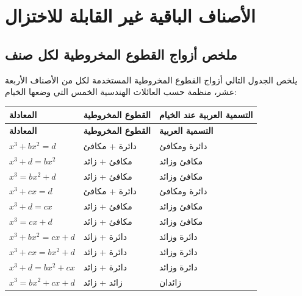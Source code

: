 \documentclass[11pt,a4paper]{book}
\newcommand{\ar}[1]{\leavevmode\arabicfont\beginR #1\endR}
\begin{document}
\section{\ar{الأصناف الباقية غير القابلة للاختزال}}

\subsection{\ar{ملخص أزواج القطوع المخروطية لكل صنف}}

\ar{يلخص الجدول التالي أزواج القطوع المخروطية المستخدمة لكل من الأصناف الأربعة عشر، منظمة حسب العائلات الهندسية الخمس التي وضعها الخيام:}

\begin{center}
\renewcommand{\arraystretch}{1.4}
\begin{longtable}{p{4.5cm}p{3cm}p{4.5cm}}
\toprule
\textbf{\ar{المعادلة}} & \textbf{\ar{القطوع المخروطية}} & \textbf{\ar{التسمية العربية عند الخيام}} \\
\midrule
\endfirsthead
\toprule
\textbf{\ar{المعادلة}} & \textbf{\ar{القطوع المخروطية}} & \textbf{\ar{التسمية العربية}} \\
\midrule
\endhead
\bottomrule
\endfoot
$x^3 + bx^2 = d$ & \ar{دائرة + مكافئ} & \ar{دائرة ومكافئ} \\
$x^3 + d = bx^2$ & \ar{مكافئ + زائد} & \ar{مكافئ وزائد} \\
$x^3 = bx^2 + d$ & \ar{مكافئ + زائد} & \ar{مكافئ وزائد} \\
$x^3 + cx = d$ & \ar{دائرة + مكافئ} & \ar{دائرة ومكافئ} \\
$x^3 + d = cx$ & \ar{مكافئ + زائد} & \ar{مكافئ وزائد} \\
$x^3 = cx + d$ & \ar{مكافئ + زائد} & \ar{مكافئ وزائد} \\
$x^3 + bx^2 = cx + d$ & \ar{دائرة + زائد} & \ar{دائرة وزائد} \\
$x^3 + cx = bx^2 + d$ & \ar{دائرة + زائد} & \ar{دائرة وزائد} \\
$x^3 + d = bx^2 + cx$ & \ar{دائرة + زائد} & \ar{دائرة وزائد} \\
$x^3 = bx^2 + cx + d$ & \ar{زائد + زائد} & \ar{زائدان} \\
\bottomrule
\end{longtable}
\end{center}
\end{document}
